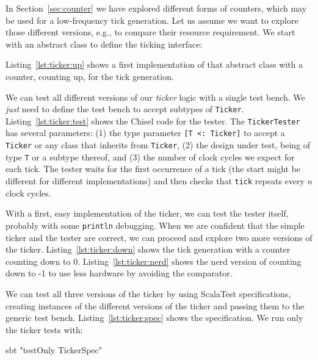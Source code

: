 \documentclass[%
    10pt,
    headinclude, footexclude,
    openright, %
    notitlepage,
    cleardoubleempty,
    headsepline,
    pointlessnumbers,
    bibtotoc, idxtotoc,
    ]{scrbook}
\newcommand{\code}[1]{{\small{\texttt{#1}}}}
\begin{document}
In Section~\ref{sec:counter} we have explored different forms of counters,
which may be used for a low-frequency tick generation. Let us assume we want to
explore those different versions, e.g., to compare their resource requirement.
We start with an abstract class to define the ticking interface:


\noindent Listing~\ref{lst:ticker:up} shows a first implementation of that abstract class
with a counter, counting up, for the tick generation.


We can test all different versions of our \emph{ticker} logic with a single test bench.
We \emph{just} need to define the test bench to accept subtypes of \code{Ticker}.
Listing~\ref{lst:ticker:test} shows the Chisel code for the tester.
The \code{TickerTester} has several parameters: (1) the type parameter
\code{[T <: Ticker]} to accept a \code{Ticker} or any class that inherits from \code{Ticker},
(2) the design under test, being of type \code{T} or a subtype thereof,
and (3) the number of clock cycles we expect for each tick.
The tester waits for the first occurrence of a tick (the start might be different for
different implementations) and then checks that \code{tick} repeats every $n$ clock cycles.


With a first, easy implementation of the ticker, we can test the tester
itself, probably with some \code{println} debugging. When we are confident that
the simple ticker and the tester are correct, we can proceed and explore
two more versions of the ticker. Listing~\ref{lst:ticker:down} shows the tick
generation with a counter counting down to 0.
Listing~\ref{lst:ticker:nerd} shows the nerd version of counting down to -1 to use
less hardware by avoiding the comparator.



We can test all three versions of the ticker by using ScalaTest specifications,
creating instances of the different versions of the ticker and passing them
to the generic test bench. Listing~\ref{lst:ticker:spec} shows the specification.
We run only the ticker tests with:
\begin{chisel}
sbt "testOnly TickerSpec"
\end{chisel}
\end{document}
